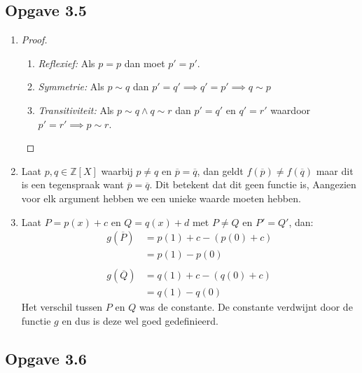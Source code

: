 \documentclass{article}
\newcommand{\Z}{\mathbb{Z}}
\newcommand{\ol}[1]{\overline{#1}}
\begin{document}
\subsection*{Opgave 3.5}
\begin{enumerate}[label=\alph*)]
    \item
          \begin{proof}
              \begin{enumerate}[label=\arabic*]
                  \item \emph{Reflexief:} Als $p = p$ dan moet $p' = p'$.
                  \item \emph{Symmetrie:} Als $p \sim q$ dan $p' = q'
                            \implies q' = p' \implies q \sim p$
                  \item \emph{Transitiviteit:} Als $p \sim q \wedge q \sim r$
                        dan $p' = q'$ en $q' = r'$ waardoor $p' = r' \implies p \sim r$.
              \end{enumerate}
          \end{proof}
    \item
          Laat $p, q \in \Z[X]$ waarbij $p \neq q$ en $\ol{p} = \ol{q}$,
          dan geldt $f(\ol{p}) \neq f(\ol{q})$
          maar dit is een tegenspraak want $\ol{p} = \ol{q}$.
          Dit betekent dat dit geen functie is, Aangezien
          voor elk argument hebben we een unieke waarde moeten hebben.
    \item
          Laat $P = p(x) + c$ en $Q = q(x) + d$ met
          $P \neq Q$ en $P' = Q'$, dan:
          \begin{align*}
              g(\ol{P}) & = p(1) + c - (p(0) + c) \\
                        & = p(1) - p(0)           \\ \\
              g(\ol{Q}) & = q(1) + c - (q(0) + c) \\
                        & = q(1) - q(0)
          \end{align*}
          Het verschil tussen $P$ en $Q$ was de constante.
          De constante verdwijnt door de functie $g$ en dus is
          deze wel goed gedefinieerd.
\end{enumerate}
\subsection*{Opgave 3.6}
\end{document}
